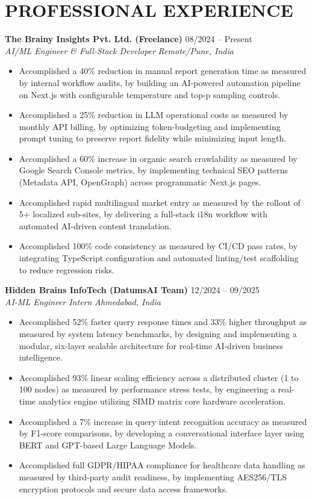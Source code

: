 \documentclass[10pt, a4paper]{article}
\newcommand{\experienceitem}[4]{
  \noindent \textbf{#1} \hfill #2 \\
  \textit{#3} \hfill \textit{#4}
}
\begin{document}
\section{PROFESSIONAL EXPERIENCE}

\experienceitem{The Brainy Insights Pvt. Ltd. (Freelance)}{08/2024 -- Present}{AI/ML Engineer \& Full-Stack Developer}{Remote/Pune, India}
\begin{itemize}
    \item Accomplished a 40\% reduction in manual report generation time as measured by internal workflow audits, by building an AI-powered automation pipeline on Next.js with configurable temperature and top-p sampling controls.
    \item Accomplished a 25\% reduction in LLM operational costs as measured by monthly API billing, by optimizing token-budgeting and implementing prompt tuning to preserve report fidelity while minimizing input length.
    \item Accomplished a 60\% increase in organic search crawlability as measured by Google Search Console metrics, by implementing technical SEO patterns (Metadata API, OpenGraph) across programmatic Next.js pages.
    \item Accomplished rapid multilingual market entry as measured by the rollout of 5+ localized sub-sites, by delivering a full-stack i18n workflow with automated AI-driven content translation.
    \item Accomplished 100\% code consistency as measured by CI/CD pass rates, by integrating TypeScript configuration and automated linting/test scaffolding to reduce regression risks.
\end{itemize}

\experienceitem{Hidden Brains InfoTech (DatumsAI Team)}{12/2024 -- 09/2025}{AI-ML Engineer Intern}{Ahmedabad, India}
\begin{itemize}
    \item Accomplished 52\% faster query response times and 33\% higher throughput as measured by system latency benchmarks, by designing and implementing a modular, six-layer scalable architecture for real-time AI-driven business intelligence.
    \item Accomplished 93\% linear scaling efficiency across a distributed cluster (1 to 100 nodes) as measured by performance stress tests, by engineering a real-time analytics engine utilizing SIMD matrix core hardware acceleration.
    \item Accomplished a 7\% increase in query intent recognition accuracy as measured by F1-score comparisons, by developing a conversational interface layer using BERT and GPT-based Large Language Models.
    \item Accomplished full GDPR/HIPAA compliance for healthcare data handling as measured by third-party audit readiness, by implementing AES256/TLS encryption protocols and secure data access frameworks.
\end{itemize}
\end{document}
